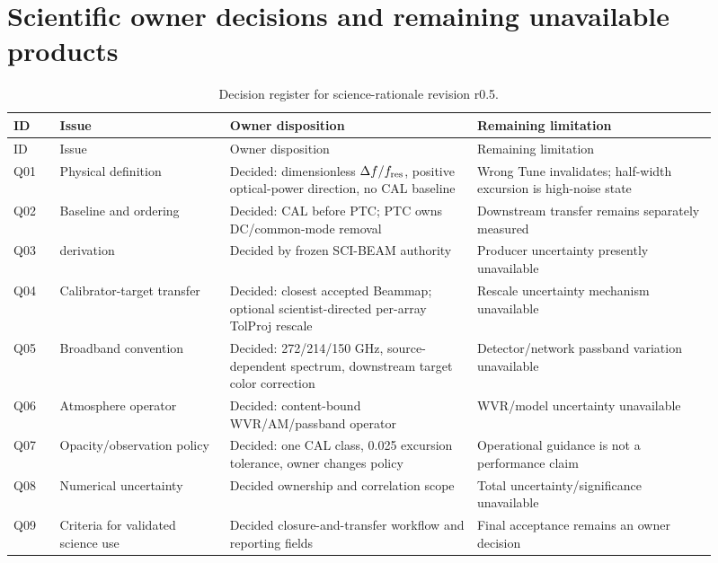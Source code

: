 \documentclass[11pt]{article}
\begin{document}
\section{Scientific owner decisions and remaining unavailable products}\label{sec:decisions}
\begin{longtable}{L{0.06\linewidth}L{0.22\linewidth}L{0.32\linewidth}L{0.31\linewidth}}
\caption{Decision register for science-rationale revision r0.5.}\label{tab:decisions}\\
\toprule ID & Issue & Owner disposition & Remaining limitation \\
\midrule\endfirsthead
\toprule ID & Issue & Owner disposition & Remaining limitation \\
\midrule\endhead
Q01 & Physical  definition & Decided: dimensionless \(\Delta f/f_{\rm res}\), positive optical-power direction, no CAL baseline & Wrong Tune invalidates; half-width excursion is high-noise state \\
Q02 & Baseline and ordering & Decided: CAL before PTC; PTC owns DC/common-mode removal & Downstream transfer remains separately measured \\
Q03 &  derivation & Decided by frozen SCI-BEAM authority & Producer uncertainty presently unavailable \\
Q04 & Calibrator-target transfer & Decided: closest accepted Beammap; optional scientist-directed per-array TolProj rescale & Rescale uncertainty mechanism unavailable \\
Q05 & Broadband convention & Decided: 272/214/150 GHz, source-dependent spectrum, downstream target color correction & Detector/network passband variation unavailable \\
Q06 & Atmosphere operator & Decided: content-bound WVR/AM/passband operator & WVR/model uncertainty unavailable \\
Q07 & Opacity/observation policy & Decided: one CAL class, 0.025 excursion tolerance, owner changes policy & Operational guidance is not a performance claim \\
Q08 & Numerical uncertainty & Decided ownership and correlation scope & Total uncertainty/significance unavailable \\
Q09 & Criteria for validated science use & Decided closure-and-transfer workflow and reporting fields & Final acceptance remains an owner decision \\
\bottomrule\end{longtable}
\end{document}
